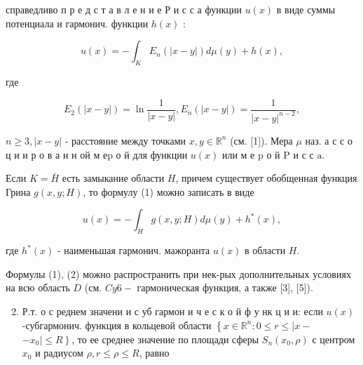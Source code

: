 \documentclass[10pt]{article}
\begin{document}
справедливо п р е д с т а в л е н и е Р и с с а функции $u(x)$ в виде суммы потенциала и гармонич. функции $h(x)$ :



\[

u(x)=-\int_{K} E_{n}(|x-y|) d \mu(y)+h(x),

\]



где



\[

E_{2}(|x-y|)=\ln \frac{1}{|x-y|}, E_{n}(|x-y|)=\frac{1}{|x-y|^{n-2}},

\]



$n \geqslant 3,|x-y|$ - расстояние между точками $x, y \in \mathbb{R}^{n}$ (см. [1]). Мера $\mu$ наз. а с с о ц и и р о в а н н ой м е$\mathrm{p}$ о й для функции $u(x)$ или м е $\mathrm{p}$ о й $\mathrm{P}$ и с с $\mathrm{a}$.



Если $K=\bar{H}$ есть замыкание области $H$, причем существует обобщенная функция Грина $g(x, y ; H)$, то формулу (1) можно записать в виде



\[

u(x)=-\int_{\bar{H}} g(x, y ; H) d \mu(y)+h^{*}(x),

\]



где $h^{*}(x)$ - наименьшая гармонич. мажоранта $u(x)$ в области $H$.



Формулы (1), (2) можно распространить при нек-рых дополнительных условиях на всю область $D$ (см. $C y 6-$ гармоническая функция, а также [3], [5]).



\begin{enumerate}

  \setcounter{enumi}{1}

  \item Р.т. о с реднем значени и с уб гармон и ч е с к о й ф у нк ц и и: если $u(x)$-субгармонич. функция в кольцевой области $\left\{x \in \mathbb{R}^{n}: 0 \leqslant r \leqslant \mid x-\right.$ $\left.-x_{0} \mid \leqslant R\right\}$, то ее среднее значение по площади сферы $S_{n}\left(x_{0}, \rho\right)$ с центром $x_{0}$ и радиусом $\rho, r \leqslant \rho \leqslant R$, равно

\end{enumerate}
\end{document}
